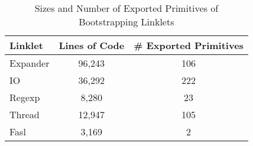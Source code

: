 \begin{table}[!htbp]
  \centering
  \begin{tabular}{lcc}
    \toprule
    \textbf{Linklet} & \textbf{Lines of Code} & \textbf{\# Exported Primitives} \\
    \midrule \midrule
    Expander & 96,243 & 106 \\
    IO & 36,292 & 222 \\
    Regexp & 8,280 & 23 \\
    Thread & 12,947 & 105 \\
    Fasl & 3,169 & 2 \\
    \bottomrule
  \end{tabular}

  \caption{Sizes and Number of Exported Primitives of Bootstrapping Linklets}
  \label{table:bootstrapping-linklets}
\end{table}
